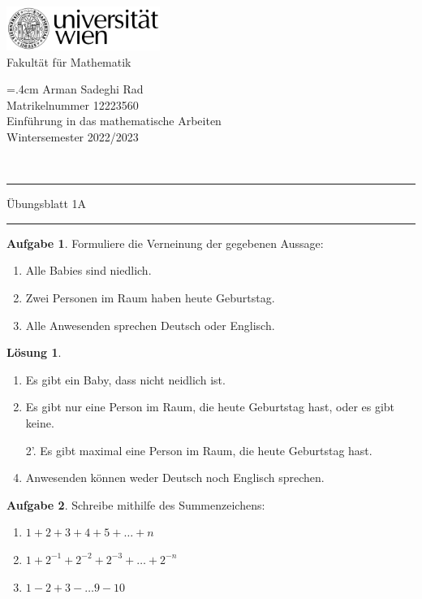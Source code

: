 \documentclass{article}
\theoremstyle{definition}
\newtheorem{ub}{Aufgabe}
\newtheorem*{lo*}{Lösung}
\begin{document}
\thispagestyle{plain}
\begin{minipage}{5cm}
	\includegraphics[width=5cm]{logo}\\
	\centering
	Fakultät für Mathematik
\end{minipage}
\hfill
\begin{minipage}{7cm}
	\baselineskip=.4cm
	Arman Sadeghi Rad\\
	Matrikelnummer 12223560 \\
	Einführung in das mathematische Arbeiten \\
	Wintersemester 2022/2023
\end{minipage}\\[1mm]
\hrule height2pt \vskip1mm
\noindent
Übungsblatt 1A
\hrule height2pt \vskip1mm
\begin{ub}
	Formuliere die Verneinung der gegebenen Aussage:
	\begin{enumerate}
		\item Alle Babies sind niedlich.
		\item Zwei Personen im Raum haben heute Geburtstag.
		\item Alle Anwesenden sprechen Deutsch oder Englisch.
	\end{enumerate}
\end{ub}
\begin{tcolorbox}
	\begin{lo*}
		\begin{enumerate}
			\item Es gibt ein Baby, dass nicht neidlich ist.
			\item Es gibt nur eine Person im Raum, die heute Geburtstag hast, oder es gibt keine.
			\item[2'.] Es gibt maximal eine Person im Raum, die heute Geburtstag hast.
			\item Anwesenden können weder Deutsch noch Englisch sprechen.
		\end{enumerate}
	\end{lo*}
\end{tcolorbox}
\begin{ub}
	Schreibe mithilfe des Summenzeichens:
	\begin{enumerate}
		\item $ 1 + 2 + 3 + 4 + 5 + \ldots + n $
		\item $ 1 + 2^{-1} + 2^{-2} + 2^{-3} + \ldots + 2^{-n} $
		\item $ 1-2+3-\ldots 9 -10 $	
	\end{enumerate}
\end{ub}
\end{document}
